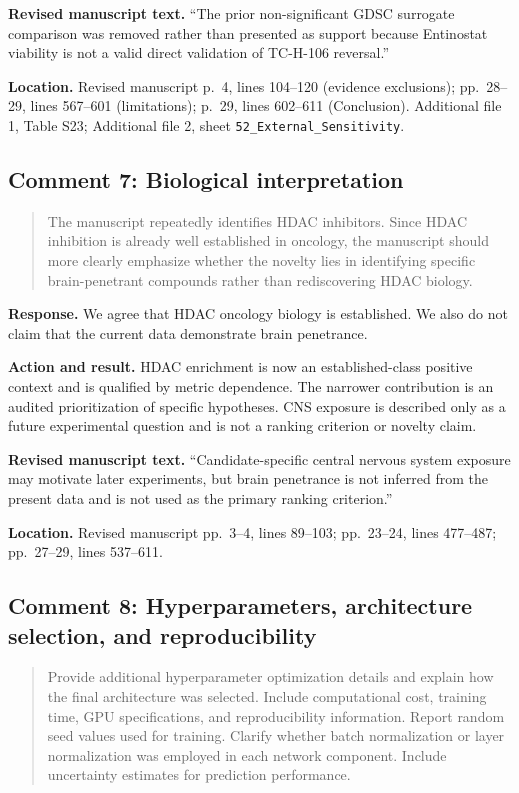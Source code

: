 \documentclass[10pt]{article}
\newenvironment{reviewcomment}{%
  \begin{quote}\small\itshape\color{black}
}{\end{quote}}
\newcommand{\Response}{\textbf{Response.} }
\newcommand{\Action}{\textbf{Action and result.} }
\newcommand{\RevisedText}{\textbf{Revised manuscript text.} }
\newcommand{\Location}{\textbf{Location.} }
\newcommand{\qtext}[1]{``#1''}
\begin{document}
\RevisedText \qtext{The prior non-significant GDSC surrogate comparison was removed rather than presented as support because Entinostat viability is not a valid direct validation of TC-H-106 reversal.}

\Location Revised manuscript p.~4, lines 104--120 (evidence exclusions); pp.~28--29, lines 567--601 (limitations); p.~29, lines 602--611 (Conclusion). Additional file 1, Table S23; Additional file 2, sheet \texttt{52\_External\_Sensitivity}.

\subsection*{Comment 7: Biological interpretation}
\begin{reviewcomment}
The manuscript repeatedly identifies HDAC inhibitors. Since HDAC inhibition is already well established in oncology, the manuscript should more clearly emphasize whether the novelty lies in identifying specific brain-penetrant compounds rather than rediscovering HDAC biology.
\end{reviewcomment}

\Response We agree that HDAC oncology biology is established. We also do not claim that the current data demonstrate brain penetrance.

\Action HDAC enrichment is now an established-class positive context and is qualified by metric dependence. The narrower contribution is an audited prioritization of specific hypotheses. CNS exposure is described only as a future experimental question and is not a ranking criterion or novelty claim.

\RevisedText \qtext{Candidate-specific central nervous system exposure may motivate later experiments, but brain penetrance is not inferred from the present data and is not used as the primary ranking criterion.}

\Location Revised manuscript pp.~3--4, lines 89--103; pp.~23--24, lines 477--487; pp.~27--29, lines 537--611.

\subsection*{Comment 8: Hyperparameters, architecture selection, and reproducibility}
\begin{reviewcomment}
Provide additional hyperparameter optimization details and explain how the final architecture was selected. Include computational cost, training time, GPU specifications, and reproducibility information. Report random seed values used for training. Clarify whether batch normalization or layer normalization was employed in each network component. Include uncertainty estimates for prediction performance.
\end{reviewcomment}
\end{document}
